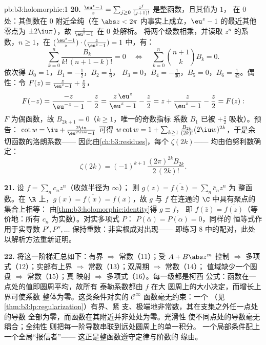 \begin{solution}{pb:b3:holomorphic:1}
\textbf{20.} $\frac{\eu^z - 1}z =
\sum_{j\geq0}\frac{z^j}{(j+1)!}$ 是整函数，且其值为 $1$，
在 $0$ 处：其倒数在 $0$ 附近全纯（在 $\abs z <
2\pi$ 内事实上成立，$\eu^z - 1$ 的最近其他零点为
$\pm2\iu\pi$），故 $\frac z{\eu^z-1}$ 在 $0$ 处解析。
将两个级数相乘，并读取
$z^n$ 的系数，$n \geq 1$，在 $(\frac{\eu^z-1}z)\cdot(\frac
z{\eu^z-1}) = 1$ 中，有：
\[
\sum_{k=0}^{n}\frac{B_k}{k!\,(n+1-k)!} = 0
\quad\Longleftrightarrow\quad
\sum_{k=0}^{n}\binom{n+1}{k}B_k = 0 .
\]
依次得 $B_0 = 1$，$B_1 = -\frac12$，$B_2 = \frac16$，
$B_3 = 0$，$B_4 = -\frac1{30}$，$B_5 = 0$，$B_6 =
\frac1{42}$。偶性：令 $F(z) = \frac z{\eu^z-1} +
\frac z2$，
\[
F(-z) = \frac{-z}{\eu^{-z} - 1} - \frac z2
= \frac{z\,\eu^z}{\eu^z - 1} - \frac z2
= z + \frac{z}{\eu^z - 1} - \frac z2 = F(z) :
\]
$F$ 为偶函数，故 $B_{2k+1} = 0$（$k \geq 1$，唯一的奇数指标
系数 $B_1$ 已被 $+\frac z2$ 吸收）。预告：
$\cot w = \iu + \frac{2\iu}{\eu^{2\iu w}-1}$ 可得
$w\cot w = 1 + \sum_{k\geq1}\frac{B_{2k}}{(2k)!}(2\iu
w)^{2k}$，于是余切函数的洛朗系数——
因此由\cref{ch:b3:residues}，每个 $\zeta(2k)$——
均由伯努利数确定：
\[
\zeta(2k) = (-1)^{k+1}\,\frac{(2\pi)^{2k}B_{2k}}{2\,(2k)!} .
\]

\textbf{21.} 设 $f = \sum_nc_nz^n$（收敛半径为 $\infty$）；
则 $g(z) = \overline{f(\bar z)} = \sum_n\bar c_nz^n$ 为
整函数。在 $\R$ 上，$g(x) = \overline{f(x)} = f(x)$，故 $g$ 与
$f$ 在连通的 $\C$ 中具有聚点的集合上相等：
由\cref{thm:b3:holomorphic:identity}得 $g \equiv f$，
即 $f(\bar z) = \overline{f(z)}$（等价地：所有
$c_n$ 为实数）。对实多项式 $P$：
$P(\bar\alpha) = \overline{P(\alpha)} = 0$，同样的
恒等式作用于实导数 $P', P'', \dots$
保持重数：非实根成对出现——
即练习 8 中的配对，此处以解析方法重新证明。

\textbf{22.} 将这一阶梯汇总如下：有界 $\Rightarrow$
常数（11）；受 $A + B\abs z^m$ 控制 $\Rightarrow$
多项式（12）；实部有上界 $\Rightarrow$
常数（13）；双周期 $\Rightarrow$ 常数（14）；
值域缺少一个圆盘 $\Rightarrow$ 常数（15）；真
映射 $\Rightarrow$ 多项式（16）。每一级都是柯西
公式：函数在一点处的值即圆周平均，故所有
泰勒系数都由 $f$ 在大
圆周上的大小决定，而增长上界可使系数
整体为零。这类条件对实的 $\mathcal
C^\infty$ 函数毫无约束：一个
（见\cref{thm:b3:lp:regularization}）有界、紧
支、极端地非常数，其在支集之外任一点处的导数
全部为零，而函数在其附近并非处处为零。光滑性
使不同点处的导数毫无耦合；全纯性
则把每一阶导数串联到远处圆周上的单一积分。
一个局部条件配上一个全局“报信者”——
这正是整函数遵守定律与阶数的
缘由。


\end{solution}
